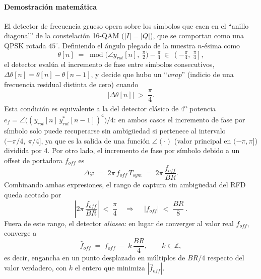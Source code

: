 \paragraph{Demostración matemática}
El detector de frecuencia grueso opera sobre los símbolos que caen en el
``anillo diagonal'' de la constelación 16-QAM ($|I|=|Q|$), que se comportan
como una QPSK rotada $45^\circ$. Definiendo el ángulo plegado de la muestra
$n$-ésima como
\begin{equation}
    \theta[n] \;=\; \operatorname{mod}\!\big(\angle y_{rot}[n],\ \tfrac{\pi}{2}\big) - \tfrac{\pi}{4}
    \ \in\ \left(-\tfrac{\pi}{4},\ \tfrac{\pi}{4}\right],
\end{equation}
el detector evalúa el incremento de fase entre símbolos consecutivos,
$\Delta\theta[n] = \theta[n] - \theta[n-1]$, y decide que hubo un
``\emph{wrap}'' (indicio de una frecuencia residual distinta de cero) cuando
\begin{equation}
    |\Delta\theta[n]| \;>\; \frac{\pi}{4}.
\end{equation}
Esta condición es equivalente a la del
detector clásico de 4\textsuperscript{a} potencia
$e_f = \angle\!\big((y_{rot}[n]\, y_{rot}^*[n-1])^4\big)/4$: en ambos casos el
incremento de fase por símbolo solo puede recuperarse sin ambigüedad si
pertenece al intervalo $(-\pi/4,\ \pi/4]$, ya que es la salida de una función
$\angle(\cdot)$ (valor principal en $(-\pi,\pi]$) dividida por 4.
Por otro lado, el incremento de fase por símbolo debido a un offset de
portadora $f_{off}$ es
\begin{equation}
    \Delta\varphi \;=\; 2\pi\, f_{off}\, T_{sym} \;=\; 2\pi\, \frac{f_{off}}{BR}.
\end{equation}
Combinando ambas expresiones, el rango de captura sin ambigüedad del RFD
queda acotado por
\begin{equation}
    \left|2\pi\,\frac{f_{off}}{BR}\right| \;<\; \frac{\pi}{4}
    \quad\Longrightarrow\quad
    \boxed{\ |f_{off}| \;<\; \dfrac{BR}{8}\ }.
\end{equation}
Fuera de este rango, el detector \emph{aliasea}: en lugar de converger al
valor real $f_{off}$, converge a
\begin{equation}
    \hat f_{off} \;=\; f_{off} \;-\; k\,\dfrac{BR}{4}, \qquad k\in\mathbb{Z},
    \label{eq:alias}
\end{equation}
es decir, engancha en un punto desplazado en múltiplos de $BR/4$ respecto del
valor verdadero, con $k$ el entero que minimiza $|\hat f_{off}|$.

